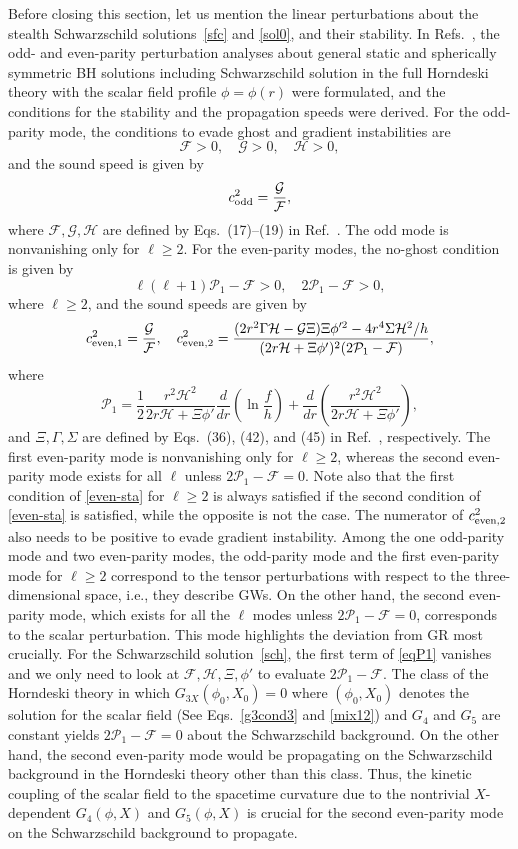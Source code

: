 \documentclass[prd,amsmath,amssymb,floatfix,superscriptaddress,notitlepage,nofootinbib,preprintnumbers]{revtex4-1}
\newcommand{\f}[2]{\frac{#1}{#2}}
\newcommand{\mk}[1]{\left( #1 \right)}
\newcommand{\be}{\begin{equation}}
\newcommand{\ee}{\end{equation}}
\newcommand{\F}{\mathcal{F}}
\newcommand{\G}{\mathcal{G}}
\renewcommand{\H}{\mathcal{H}}
\renewcommand{\P}{\mathcal{P}}
\begin{document}
Before closing this section,
let us mention the linear perturbations about the stealth Schwarzschild
solutions~\eqref{sfc} and \eqref{sol0},
and their stability. 
In Refs.~\cite{Kobayashi:2012kh,Kobayashi:2014wsa},
the odd- and even-parity perturbation analyses 
about general static and spherically symmetric BH solutions 
including Schwarzschild solution in the full Horndeski theory 
with the scalar field profile $\phi=\phi(r)$ were formulated, 
and  
the conditions for the stability and the propagation speeds were derived.
For the odd-parity mode, 
the conditions to evade ghost and gradient instabilities are
\be \label{odd-sta} \F>0,\quad \G>0, \quad \H>0, \ee
and the sound speed is given by
\be \label{odd-cs} c^2_{\rm odd} = \f{\G}{\F}, \ee
where $\F,\G,\H$ are defined by Eqs.~(17)--(19) in Ref.~\cite{Kobayashi:2012kh}. 
The odd mode is nonvanishing only for $\ell\geq 2$.
For the even-parity modes, the no-ghost condition is given by
\be \label{even-sta} \ell(\ell+1) \P_1 -\F >0 ,\quad 2\P_1 -\F > 0, \ee
where $\ell\geq 2$, and the sound speeds are given by
\be \label{even-cs} 
c^2_{{\rm even},1} = \f{\G}{\F} ,\quad 
c^2_{{\rm even},2}
=\f{(2r^2\Gamma\H
-\G\Xi)\Xi\phi'^2-4r^4\Sigma\H^2/h}{(2r\H+\Xi\phi')^2(2\P_1 -\F)}, \ee
where 
\be \label{eqP1} \P_1
= \f{1}{2} \f{r^2  \H^2}{2 r \H + \Xi \phi'} \f{d}{dr} \mk{ \ln \f{f}{h} } 
+ \f{d}{dr} \mk{ \f{r^2  \H^2}{2 r \H + \Xi \phi'}} , \ee
and $\Xi,\Gamma,\Sigma$ are defined by Eqs.~(36), (42), and (45) in Ref.~\cite{Kobayashi:2014wsa},
respectively.
The first even-parity mode is nonvanishing only for $\ell\geq 2$, whereas the second even-parity mode exists for all $\ell$ unless $2\P_1-\F=0$.
Note also that the first condition of \eqref{even-sta} for $\ell\geq 2$ is always satisfied if the second condition of \eqref{even-sta} is satisfied, while the opposite is not the case.  
The numerator of $c^2_{{\rm even},2}$ also needs to be positive to evade gradient instability.
Among the one odd-parity mode and two even-parity modes, 
the odd-parity mode and the first even-parity mode for $\ell\geq 2$
correspond to the tensor perturbations with respect to the three-dimensional space, 
i.e., they describe GWs.
On the other hand, the second even-parity mode,
which exists for all the $\ell$ modes unless $2\P_1-\F=0$,
corresponds to the scalar perturbation.
This mode highlights the deviation from GR most crucially.
For the Schwarzschild solution~\eqref{sch}, the first term of \eqref{eqP1} 
vanishes and we only need to look at $\F,\H,\Xi,\phi'$ to evaluate $2\P_1-\F$.
The class of the Horndeski theory 
in which $G_{3X}(\phi_0,X_0)=0$ where $(\phi_0,X_0)$ denotes the solution for the scalar field
(See Eqs.~\eqref{g3cond3} and \eqref{mix12})   
and $G_4$ and $G_5$ are constant 
yields $2\P_1-\F=0$ about the Schwarzschild background. 
On the other hand, 
the second even-parity mode would be
propagating on the Schwarzschild background 
in the Horndeski theory other than this class.
Thus, the kinetic coupling 
of the scalar field to the spacetime curvature
due to the nontrivial $X$-dependent $G_4(\phi,X)$ and $G_5(\phi,X)$ is
crucial for the second even-parity mode on the Schwarzschild background to propagate.
\end{document}
